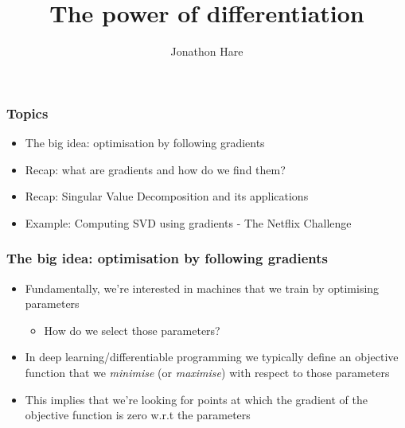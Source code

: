 \documentclass[\beamerclass]{beamer}
\title[Differentiation]{The power of differentiation}
\author{Jonathon Hare}
\institute[]
{
  Vision, Learning and Control\\
  University of Southampton 
}
\date{}
\begin{document}
\begin{frame}[plain]
\end{frame}

\frame{
  \titlepage
}

\begin{frame}
\frametitle{Topics}
\begin{itemize}
	\item The big idea: optimisation by following gradients
	\item Recap: what are gradients and how do we find them?
	\item Recap: Singular Value Decomposition and its applications
	\item Example: Computing SVD using gradients - The Netflix Challenge
\end{itemize}
\end{frame}

\begin{frame}
\frametitle{The big idea: optimisation by following gradients}
\begin{itemize}
	\item<+-> Fundamentally, we're interested in machines that we train by optimising parameters
	\begin{itemize}
		\item<+-> How do we select those parameters?
	\end{itemize}
	\item<+-> In deep learning/differentiable programming we typically define an objective function that we \emph{minimise} (or \emph{maximise}) with respect to those parameters
	\item<+-> This implies that we're looking for points at which the gradient of the objective function is zero w.r.t the parameters
\end{itemize}
\end{frame}
\end{document}
